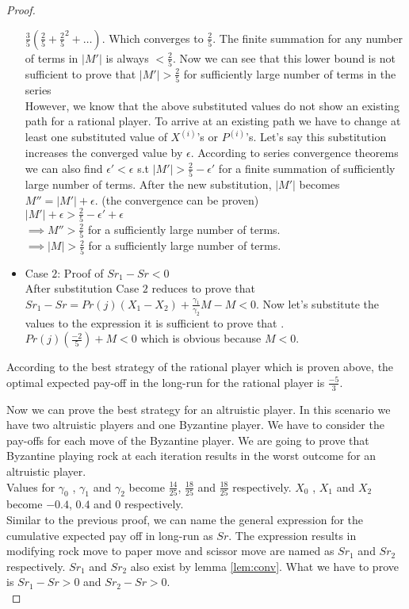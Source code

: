 \begin{proof}
\begin{itemize}
 	$\frac{3}{5}(\frac{2}{5}+\frac{2}{5}^2+ \dots)$. Which converges to $\frac{2}{5}$. The finite summation for any number of terms in $|M'|$ is always $< \frac{2}{5}$. Now we can see that this lower bound is not sufficient to prove that $|M'| > \frac{2}{5}$ for sufficiently large number of terms in the series\\
 	However, we know that the above substituted values do not show an existing path for a rational player. To arrive at an existing path we have to change at least one substituted value of $X^{(i)}$'s or $P^{(i)}$'s. Let's say this substitution increases the converged value by $\epsilon$. According to series convergence theorems we can also find $\epsilon' < \epsilon$ s.t $|M'| > \frac{2}{5} - \epsilon'$ for a finite summation of sufficiently large number of terms. After the new substitution, $|M'|$ becomes $M''=|M'|+\epsilon$. (the convergence can be proven)\\
 	$|M'|+\epsilon > \frac{2}{5} - \epsilon' + \epsilon$ \\
 	$\implies M'' > \frac{2}{5}$ for a sufficiently large number of terms.\\
 	$\implies |M| > \frac{2}{5}$ for a sufficiently large number of terms.
 	\item Case $2$: Proof of $Sr_1-Sr<0$\\
 	After substitution Case $2$ reduces to prove that\\
 	$Sr_1-Sr=Pr(j)(X_1-X_2)+\frac{\gamma_1}{\gamma_2}M-M < 0$. Now let's substitute the values to the expression it is sufficient to prove that .\\
 	$Pr(j)(\frac{-2}{5}) + M < 0$ which is obvious because $M < 0$.
 \end{itemize}
 
 According to the best strategy of the rational player which is proven above, the optimal expected pay-off in the long-run for the rational player is $\frac{-5}{3}$.
 
 Now we can prove the best strategy for an altruistic player. In this scenario we have two altruistic players and one Byzantine player. We have to consider the pay-offs for each move of the Byzantine player. We are going to prove that Byzantine playing  rock at each iteration results in the worst outcome for an altruistic player. \\
 Values for $\gamma_0$ , $\gamma_1$ and $\gamma_2$ become $\frac{14}{25}$, $\frac{18}{25}$ and $\frac{18}{25}$ respectively. $X_0$ , $X_1$ and $X_2$ become $-0.4$, $0.4$ and $0$ respectively.\\
 Similar to the previous proof, we can name the general expression for the cumulative expected pay off in long-run as $Sr$. The expression results in modifying rock move to paper move and scissor move are named as $Sr_1$ and $Sr_2$ respectively. $Sr_1$ and $Sr_2$ also exist by lemma \ref{lem:conv}.
 What we have to prove is $Sr_1 - Sr > 0$ and $Sr_2 - Sr > 0$.\\
 

\end{proof}

